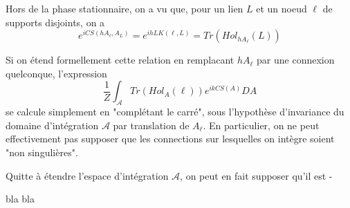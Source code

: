 \documentclass[10pt]{article}
\begin{document}
Hors de la phase stationnaire, on a vu que, pour un lien $L$ et un noeud $\ell$ de supports disjoints, on a\[e^{i CS(h A_\ell,A_{L}) }=e^{ih LK(\ell,L)}=Tr(Hol_{h A_\ell}(L))\]

Si on étend formellement cette relation en remplacant $h A_\ell$ par une connexion quelconque, l'expression
\[\frac{1}{Z}\int_{\mathcal{A}} Tr(Hol_A(\ell)) e^{i k CS(A)} DA\]
se calcule simplement en "complétant le carré", sous l'hypothèse d'invariance du domaine d'intégration $\mathcal{A}$ par translation de $A_\ell$. En particulier, on ne peut effectivement pas supposer que les connections sur lesquelles on intègre soient "non singulières".

Quitte à étendre l'espace d'intégration $\mathcal{A}$, on peut en fait supposer qu'il est -





bla
bla








\newpage







\end{document}
